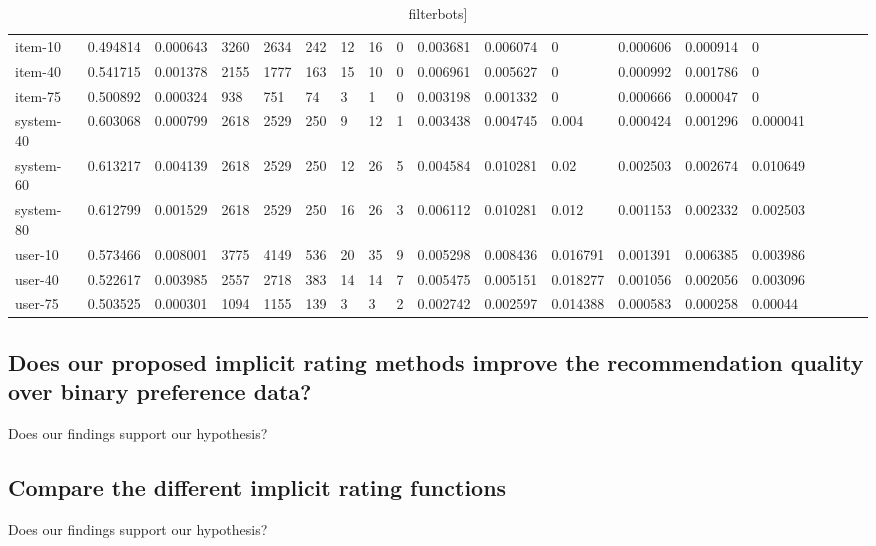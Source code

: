 \begin{table}
{\begin{tabular}{*{19}l}
item-10		&	0.494814 &	0.000643 &	3260 &	2634 &	242 &	12 &	16 &	0 &	0.003681 &	0.006074 &	0 &	0.000606 &	0.000914 &	0 &	 \\
item-40		&	0.541715 &	0.001378 &	2155 &	1777 &	163 &	15 &	10 &	0 &	0.006961 &	0.005627 &	0 &	0.000992 &	0.001786 &	0 &	 \\
item-75		&	0.500892 &	0.000324 &	938 &	751 &	74 &	3  &	1 &	0 &	0.003198 &	0.001332 &	0 &	0.000666 &	0.000047 &	0 &	 \\
system-40	&	0.603068 &	0.000799 &	2618 &	2529 &	250 &	9  &	12 &	1 &	0.003438 &	0.004745 &	0.004 &	0.000424 &	0.001296 &	0.000041 &	 \\
system-60	&	0.613217 &	0.004139 &	2618 &	2529 &	250 &	12 &	26 &	5 &	0.004584 &	0.010281 &	0.02 &	0.002503 &	0.002674 &	0.010649 &	 \\
system-80	&	0.612799 &	0.001529 &	2618 &	2529 &	250 &	16 &	26 &	3 &	0.006112 &	0.010281 &	0.012 &	0.001153 &	0.002332 &	0.002503 &	 \\
user-10		&	0.573466 &	0.008001 &	3775 &	4149 &	536 &	20 &	35 &	9 &	0.005298 &	0.008436 &	0.016791 &	0.001391 &	0.006385 &	0.003986 &	 \\
user-40		&	0.522617 &	0.003985 &	2557 &	2718 &	383 &	14 &	14 &	7 &	0.005475 &	0.005151 &	0.018277 &	0.001056 &	0.002056 &	0.003096 &	 \\
user-75		&	0.503525 &	0.000301 &	1094 &	1155 &	139 &	3 &	3 &	2 &	0.002742 &	0.002597 &	0.014388 &	0.000583 &	0.000258 &	0.00044 &	 \\
\bottomrule\end{tabular}}\caption{filterbots]}\end{table}


\subsection{Does our proposed implicit rating methods improve the recommendation quality over binary preference data?}

Does our findings support our hypothesis?



\subsection{Compare the different implicit rating functions}

Does our findings support our hypothesis?

